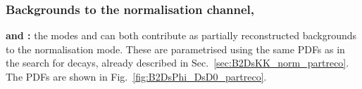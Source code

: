 \subsubsection{Backgrounds to the normalisation channel, \decay{\Bp}{\Dsp\Dzb}}

 \begin{description}
\item \textbf{\decay{\Bp}{(\decay{\Dssp}{\Dsp[\piz/\Pgamma]})\Dzb} and \decay{\Bp}{\Dsp(\decay{\Dstarzb}{\Dzb[\piz/\Pgamma]})}:}
the modes \decay{\Bp}{\Dsp\Dstarzb} and \decay{\Bp}{\Dssp\Dzb} can both contribute as partially reconstructed backgrounds to the \decay{\Bp}{\Dsp\Dzb} normalisation mode. These are parametrised using the same PDFs as in the search for \decay{\Bp}{\Ds\Kp\Km} decays, already described in Sec.~\ref{sec:B2DsKK_norm_partreco}. The PDFs are shown in Fig.~\ref{fig:B2DsPhi_DsD0_partreco}.
\end{description}



